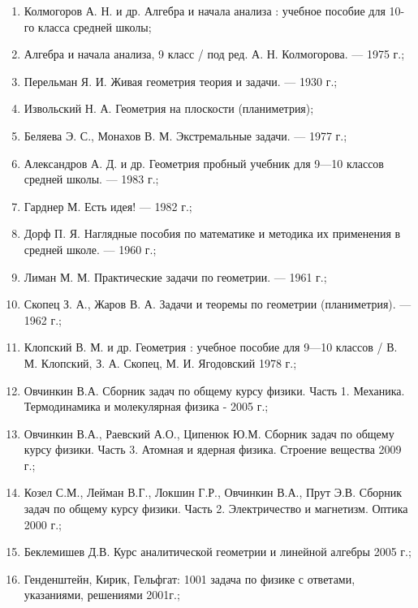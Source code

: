 \label{literature}
\begin{enumerate}
    \item Колмогоров А. Н. и др. Алгебра и начала анализа : учебное пособие для 10-го класса средней школы;
    \item Алгебра и начала анализа, 9 класс / под ред. А. Н. Колмогорова. — 1975 г.;
    \item Перельман Я. И. Живая геометрия теория и задачи. — 1930 г.;
    \item Извольский Н. А. Геометрия на плоскости (планиметрия);
    \item Беляева Э. С., Монахов В. М. Экстремальные задачи. — 1977 г.;
    \item Александров А. Д. и др. Геометрия пробный учебник для 9—10 классов средней школы. — 1983 г.;
    \item Гарднер М. Есть идея! — 1982 г.;
    \item Дорф П. Я. Наглядные пособия по математике и методика их применения в средней школе. — 1960 г.;
    \item Лиман М. М. Практические задачи по геометрии. — 1961 г.;
    \item Скопец З. А., Жаров В. А. Задачи и теоремы по геометрии (планиметрия). — 1962 г.;
    \item Клопский В. М. и др. Геометрия : учебное пособие для 9—10 классов / В. М. Клопский, З. А. Скопец, М. И. Ягодовский 1978 г.;
    \item Овчинкин В.А. Сборник задач по общему курсу физики. Часть 1. Механика. Термодинамика и молекулярная физика - 2005 г.;
    \item Овчинкин В.А., Раевский А.О., Ципенюк Ю.М. Сборник задач по общему курсу физики. Часть 3. Атомная и ядерная физика. Строение вещества 2009 г.;
    \item Козел С.М., Лейман В.Г., Локшин Г.Р., Овчинкин В.А., Прут Э.В. Сборник задач по общему курсу физики. Часть 2. Электричество и магнетизм. Оптика 2000 г.;
    \item Беклемишев Д.В. Курс аналитической геометрии и линейной алгебры 2005 г.;
    \item Генденштейн, Кирик, Гельфгат: 1001 задача по физике с ответами, указаниями, решениями 2001г.;
\end{enumerate}